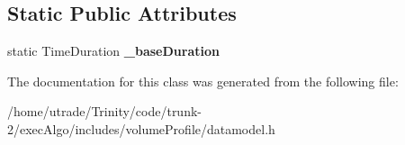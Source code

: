 \subsection*{Static Public Attributes}
\begin{DoxyCompactItemize}
\item 
\hypertarget{classmutrade_1_1_data_a_p_i_1_1_data_model_ad77ece298a067cb58ac478d9f8f78bf1}{static Time\-Duration {\bfseries \-\_\-base\-Duration}}\label{classmutrade_1_1_data_a_p_i_1_1_data_model_ad77ece298a067cb58ac478d9f8f78bf1}

\end{DoxyCompactItemize}


The documentation for this class was generated from the following file\-:\begin{DoxyCompactItemize}
\item 
/home/utrade/\-Trinity/code/trunk-\/2/exec\-Algo/includes/volume\-Profile/datamodel.\-h\end{DoxyCompactItemize}
